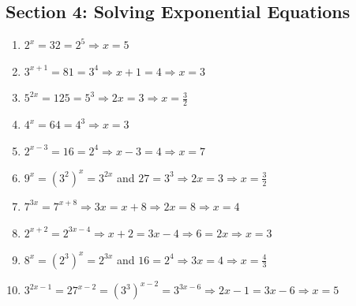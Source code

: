 \documentclass[11pt]{article}
\begin{document}
\subsection*{Section 4: Solving Exponential Equations}
\begin{enumerate}[leftmargin=1.5em, itemsep=8pt]
  \item $2^x=32=2^5 \Rightarrow x=5$
  \item $3^{x+1}=81=3^4 \Rightarrow x+1=4 \Rightarrow x=3$
  \item $5^{2x}=125=5^3 \Rightarrow 2x=3 \Rightarrow x=\tfrac{3}{2}$
  \item $4^x=64=4^3 \Rightarrow x=3$
  \item $2^{x-3}=16=2^4 \Rightarrow x-3=4 \Rightarrow x=7$
  \item $9^x=(3^2)^x=3^{2x}$ and $27=3^3 \Rightarrow 2x=3 \Rightarrow x=\tfrac{3}{2}$
  \item $7^{3x}=7^{x+8} \Rightarrow 3x=x+8 \Rightarrow 2x=8 \Rightarrow x=4$
  \item $2^{x+2}=2^{3x-4} \Rightarrow x+2=3x-4 \Rightarrow 6=2x \Rightarrow x=3$
  \item $8^x=(2^3)^x=2^{3x}$ and $16=2^4 \Rightarrow 3x=4 \Rightarrow x=\tfrac{4}{3}$
  \item $3^{2x-1}=27^{x-2}=(3^3)^{x-2}=3^{3x-6} \Rightarrow 2x-1=3x-6 \Rightarrow x=5$
\end{enumerate}
\end{document}
